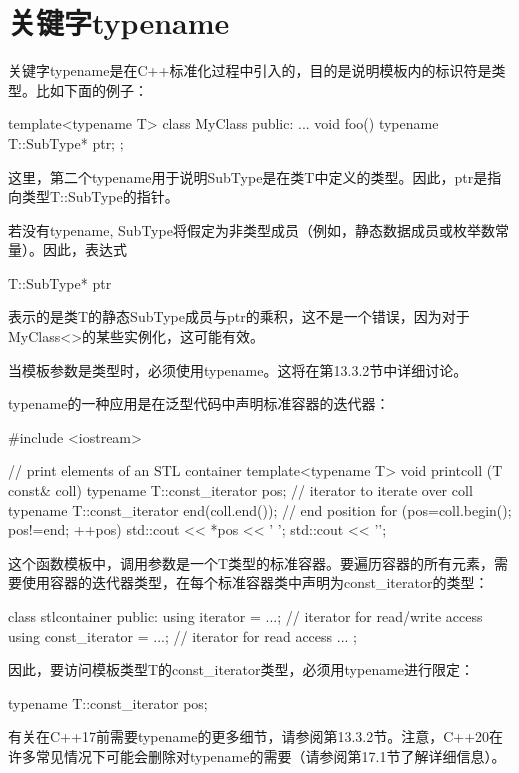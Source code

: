\section{关键字typename}
关键字typename是在C++标准化过程中引入的，目的是说明模板内的标识符是类型。比如下面的例子：

\begin{cpp}
template<typename T>
class MyClass {
	public:
	...
	void foo() {
		typename T::SubType* ptr;
	}
};
\end{cpp}

这里，第二个typename用于说明SubType是在类T中定义的类型。因此，ptr是指向类型T::SubType的指针。

若没有typename, SubType将假定为非类型成员（例如，静态数据成员或枚举数常量）。因此，表达式

\begin{cpp}
T::SubType* ptr
\end{cpp}

表示的是类T的静态SubType成员与ptr的乘积，这不是一个错误，因为对于MyClass<>的某些实例化，这可能有效。

当模板参数是类型时，必须使用typename。这将在第13.3.2节中详细讨论。

typename的一种应用是在泛型代码中声明标准容器的迭代器：

\begin{cpp}
#include <iostream>

// print elements of an STL container
template<typename T>
void printcoll (T const& coll)
{
	typename T::const_iterator pos; // iterator to iterate over coll
	typename T::const_iterator end(coll.end()); // end position
	for (pos=coll.begin(); pos!=end; ++pos) {
		std::cout << *pos << ' ';
	}
	std::cout << '\n';
}
\end{cpp}

这个函数模板中，调用参数是一个T类型的标准容器。要遍历容器的所有元素，需要使用容器的迭代器类型，在每个标准容器类中声明为const\_iterator的类型：

\begin{cpp}
class stlcontainer {
	public:
	using iterator = ...; // iterator for read/write access
	using const_iterator = ...; // iterator for read access
	...
};
\end{cpp}

因此，要访问模板类型T的const\_iterator类型，必须用typename进行限定：

\begin{cpp}
typename T::const_iterator pos;
\end{cpp}

有关在C++17前需要typename的更多细节，请参阅第13.3.2节。注意，C++20在许多常见情况下可能会删除对typename的需要（请参阅第17.1节了解详细信息）。












